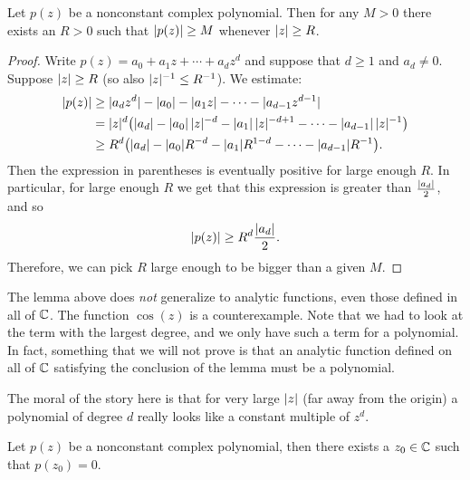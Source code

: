 \begin{lemma}
Let $p(z)$ be a nonconstant complex polynomial.  Then for any $M > 0$ there exists
an $R > 0$ such that
$\lvert {p(z)} \rvert \geq M$ whenever $\lvert {z} \rvert \geq R$.
\end{lemma}

\begin{proof}
Write $p(z) = a_0 + a_1 z + \cdots + a_d z^d$ and suppose that $d \geq 1$
and $a_d \not= 0$.
Suppose $\lvert {z} \rvert \geq R$ (so also $\lvert {z} \rvert^{-1} \leq R^{-1}$).
We estimate:
\begin{equation*}
\begin{split}
\lvert {p(z)} \rvert
& \geq
\lvert {a_d z^d} \rvert -
\lvert {a_0} \rvert - \lvert {a_1 z} \rvert - \cdots - \lvert {a_{d-1} z^{d-1} } \rvert
\\
& =
\lvert {z} \rvert^d \bigl(
\lvert {a_d} \rvert -
\lvert {a_0} \rvert \, \lvert {z} \rvert^{-d} -
\lvert {a_1} \rvert \, \lvert {z} \rvert^{-d+1} - \cdots - \lvert {a_{d-1}} \rvert \, \lvert {z} \rvert^{-1}
\bigr)
\\
& \geq
R^d \bigl(\lvert {a_d} \rvert -
\lvert {a_0} \rvert R^{-d} - \lvert {a_1} \rvert R^{1-d} - \cdots - \lvert {a_{d-1}} \rvert R^{-1} \bigr)
.
\end{split}
\end{equation*}
Then the expression in parentheses is eventually positive for large enough
$R$.  In particular, for large enough $R$ we get that this expression
is greater than
$\frac{\lvert {a_d} \rvert}{2}$, and so
\begin{equation*}
\lvert {p(z)} \rvert
\geq
R^d \frac{\lvert {a_d} \rvert}{2} .
\end{equation*}
Therefore,
we can pick $R$ large enough to be bigger than a given $M$.
\end{proof}

The lemma above does \emph{not} generalize to analytic
functions, even those defined in all of ${\mathbb{C}}$.  The function
$\cos(z)$ is a counterexample.
Note that we had to look
at the term with the largest degree, and we only have such a term for
a polynomial.  In fact, something that we will not prove is that
an analytic function defined on all of ${\mathbb{C}}$ satisfying the conclusion
of the lemma must be a polynomial.

The moral of the story here is that for very large $\lvert {z} \rvert$ (far away from
the origin) a polynomial of degree $d$ really looks like a constant multiple
of $z^d$.

\begin{thm}
%
Let $p(z)$ be a nonconstant complex polynomial, then there exists a $z_0 \in {\mathbb{C}}$
such that $p(z_0) = 0$.
\end{thm}

